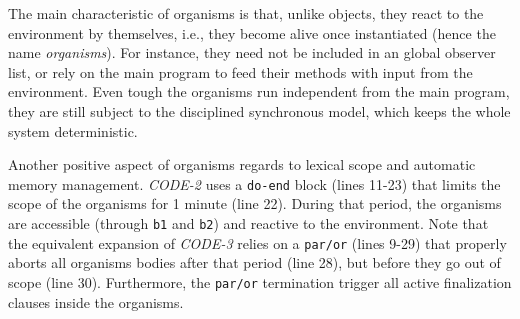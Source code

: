 \documentclass{acm_proc_article-sp}
\newcommand{\CEU}{\textsc{C\'{e}u}\xspace}
\newcommand{\code}[1] {{\small{\texttt{#1}}}}
\newcommand{\1}{\;}
\newcommand{\2}{\;\;}
\newcommand{\3}{\;\;\;}
\newcommand{\5}{\;\;\;\;\;}
\begin{document}
The main characteristic of organisms is that, unlike objects, they react to the 
environment by themselves, i.e., they become alive once instantiated (hence the 
name \emph{organisms}).
%
For instance, they need not be included in an global observer list, or rely on 
the main program to feed their methods with input from the environment.
%
Even tough the organisms run independent from the main program, they are still 
subject to the disciplined synchronous model, which keeps the whole system 
deterministic.
%

Another positive aspect of organisms regards to lexical scope and automatic 
memory management.
%
\emph{CODE-2} uses a \code{do-end} block (lines 11-23) that limits the scope of 
the organisms for 1 minute (line 22).
%
During that period, the organisms are accessible (through \code{b1} and 
\code{b2}) and reactive to the environment.
%
Note that the equivalent expansion of \emph{CODE-3} relies on a \code{par/or} 
(lines 9-29) that properly aborts all organisms bodies after that period (line 
28), but before they go out of scope (line 30).
%
Furthermore, the \code{par/or} termination trigger all active finalization 
clauses inside the organisms.
\end{document}
